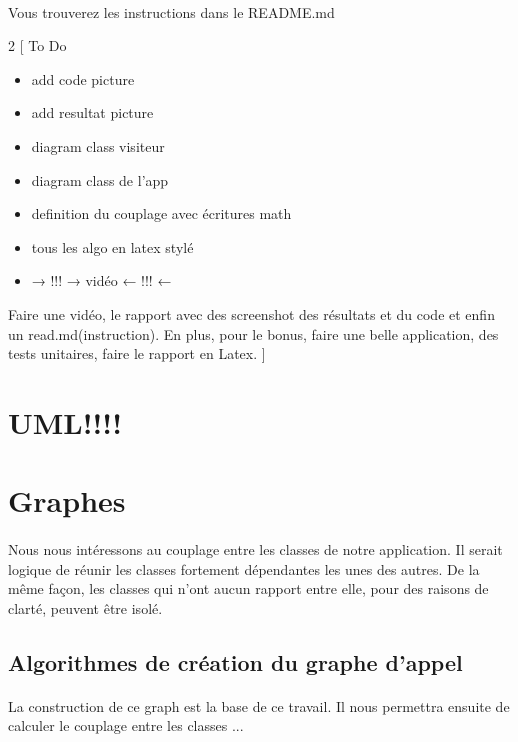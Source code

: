 \documentclass[a4paper]{article}
\begin{document}
            \paragraph{}
                Vous trouverez les instructions dans le README.md

    \newpage
    \begin{multicols}{2}
        [
            To Do
            \begin{itemize}
                \item add code picture 
                \item add resultat picture
                \item diagram class visiteur
                \item diagram class de l'app
                \item definition du couplage avec écritures math
                \item tous les algo en latex stylé
                \item → !!! → vidéo ← !!! ← 
            \end{itemize}
            Faire une vidéo, le rapport avec des screenshot des résultats et du code et enfin un read.md(instruction). En plus, pour le bonus, faire une belle application, des tests unitaires, faire le rapport en Latex.
        ]
        \section{UML!!!!}

        \section{Graphes}
        \paragraph{} 
        Nous nous intéressons au couplage entre les classes de notre application. Il serait logique de réunir les classes fortement dépendantes les unes des autres. De la même façon, les classes qui n'ont aucun rapport entre elle, pour des raisons de clarté, peuvent être isolé.
        \subsection{Algorithmes de création du graphe d'appel}
        \paragraph{} La construction de ce graph est la base de ce travail. Il nous permettra ensuite de calculer le couplage entre les classes ...


\end{multicols}
\end{document}
